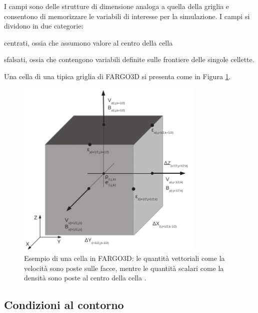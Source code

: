 I campi sono delle strutture di dimensione analoga a quella della griglia e consentono di memorizzare le variabili di interesse per la simulazione. 
I campi si dividono in due categorie:
\begin{list}{\textbf{-}}{\setlength{\itemsep}{0cm}}
    \item centrati, ossia che assumono valore al centro della cella
    \item sfalsati, ossia che contengono variabili definite sulle frontiere delle singole cellette.
\end{list}
Una cella di una tipica griglia di FARGO3D si presenta come in Figura \ref{fig:campi_far}.

\begin{figure}[h]
    \centering
    \includegraphics[width=0.8\textwidth]{Immagini/Simulazioni/CellaTipoFargo3D.png}
    \caption{Esempio di una cella in FARGO3D: le quantità vettoriali come la velocità sono poste sulle facce, mentre le quantità scalari come la densità sono poste al centro della cella \parencite{Fargo3D}.}
    \label{fig:campi_far}
\end{figure}

\subsection{Condizioni al contorno} \label{subsec:con_cont_far}

